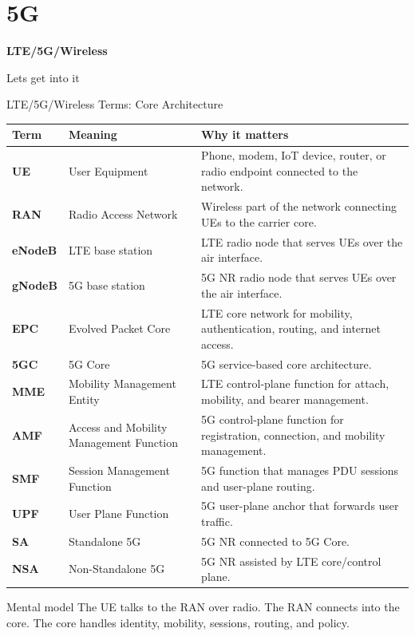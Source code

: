 \documentclass[aspectratio=169]{beamer}
\begin{document}
\section{5G}

\begin{frame}
    \centering
    \vfill

    {\Huge \textbf{LTE/5G/Wireless}}

    \vspace{0.4cm}

    {\Large Lets get into it}

    \vfill
\end{frame}



\begin{frame}{LTE/5G/Wireless Terms: Core Architecture}
\tiny
\begin{tabular}{p{2.0cm} p{3.4cm} p{6.7cm}}
\toprule
\textbf{Term} & \textbf{Meaning} & \textbf{Why it matters} \\
\midrule
\textbf{UE} & User Equipment & Phone, modem, IoT device, router, or radio endpoint connected to the network. \\
\textbf{RAN} & Radio Access Network & Wireless part of the network connecting UEs to the carrier core. \\
\textbf{eNodeB} & LTE base station & LTE radio node that serves UEs over the air interface. \\
\textbf{gNodeB} & 5G base station & 5G NR radio node that serves UEs over the air interface. \\
\textbf{EPC} & Evolved Packet Core & LTE core network for mobility, authentication, routing, and internet access. \\
\textbf{5GC} & 5G Core & 5G service-based core architecture. \\
\textbf{MME} & Mobility Management Entity & LTE control-plane function for attach, mobility, and bearer management. \\
\textbf{AMF} & Access and Mobility Management Function & 5G control-plane function for registration, connection, and mobility management. \\
\textbf{SMF} & Session Management Function & 5G function that manages PDU sessions and user-plane routing. \\
\textbf{UPF} & User Plane Function & 5G user-plane anchor that forwards user traffic. \\
\textbf{SA} & Standalone 5G & 5G NR connected to 5G Core. \\
\textbf{NSA} & Non-Standalone 5G & 5G NR assisted by LTE core/control plane. \\
\bottomrule
\end{tabular}

\vspace{0.15cm}
\begin{block}{Mental model}
The UE talks to the RAN over radio. The RAN connects into the core. The core handles identity, mobility, sessions, routing, and policy.
\end{block}
\end{frame}
\end{document}
